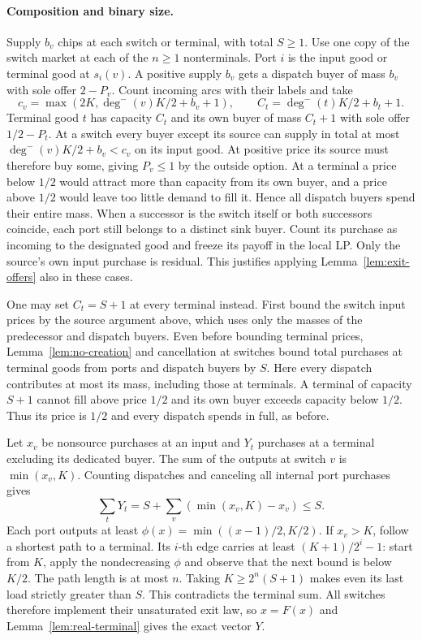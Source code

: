 \documentclass[11pt,oneside,openany,notitlepage]{report}
\begin{document}
\paragraph{Composition and binary size.}
Supply \(b_v\) chips at each switch or terminal, with total \(S\ge1\).
Use one copy of the switch market at each of the \(n\ge1\) nonterminals.
Port \(i\) is the input good or terminal good at \(s_i(v)\).
A positive supply \(b_v\) gets a dispatch buyer of mass \(b_v\) with sole
offer \(2-P_v\). Count incoming arcs with their labels and take
\[
 c_v=\max(2K,\deg^-(v)K/2+b_v+1),\qquad
 C_t=\deg^-(t)K/2+b_t+1 .
\]
Terminal good \(t\) has capacity \(C_t\) and its own buyer of mass
\(C_t+1\) with sole offer \(1/2-P_t\).
At a switch every buyer except its source can supply in total at most
\(\deg^-(v)K/2+b_v<c_v\) on its input good. At positive price its source
must therefore buy some, giving \(P_v\le1\) by the outside option.
At a terminal a price below \(1/2\) would attract more than capacity
from its own buyer, and a price above \(1/2\) would leave too little
demand to fill it. Hence all dispatch buyers spend their entire mass.
When a successor is the switch itself or both successors coincide,
each port still belongs to a distinct sink buyer. Count its purchase
as incoming to the designated good and freeze its payoff in the
local LP. Only the source's own input purchase is residual. This
justifies applying Lemma~\ref{lem:exit-offers} also in these cases.

One may set \(C_t=S+1\) at every terminal instead. First bound the switch
input prices by the source argument above, which uses only the masses of
the predecessor and dispatch buyers. Even before bounding terminal
prices, Lemma~\ref{lem:no-creation} and cancellation at switches bound
total purchases at terminal goods from ports and dispatch buyers by
\(S\). Here every dispatch contributes at most its mass, including those
at terminals. A terminal of capacity \(S+1\) cannot fill above price
\(1/2\) and its own buyer exceeds capacity below \(1/2\). Thus its price
is \(1/2\) and every dispatch spends in full, as before.

Let \(x_v\) be nonsource purchases at an input and \(Y_t\) purchases
at a terminal excluding its dedicated buyer. The sum of the outputs at
switch \(v\) is \(\min(x_v,K)\). Counting dispatches and canceling all
internal port purchases gives
\[
                    \sum_tY_t=S+\sum_v(\min(x_v,K)-x_v)\le S .
\]
Each port outputs at least \(\phi(x)=\min((x-1)/2,K/2)\).
If \(x_v>K\), follow a shortest path to a terminal. Its \(i\)-th edge
carries at least \((K+1)/2^i-1\): start from \(K\), apply the
nondecreasing \(\phi\) and observe that the next bound is below \(K/2\).
The path length is at most \(n\). Taking \(K\ge 2^n(S+1)\) makes even
its last load strictly greater than \(S\). This contradicts the terminal
sum. All switches therefore implement their unsaturated exit law, so
\(x=F(x)\) and Lemma~\ref{lem:real-terminal} gives the exact vector \(Y\).
\end{document}

